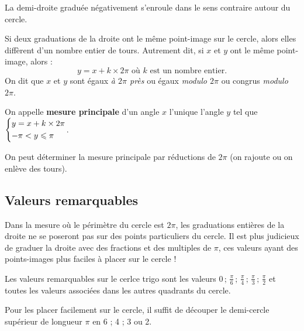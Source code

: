 \documentclass[a4paper,11pt]{article}
\begin{document}
\begin{crmq}
La demi-droite graduée négativement s'enroule dans le sens contraire autour du cercle.
\end{crmq}

\begin{cprop}
Si deux graduations de la droite ont le même point-image sur le cercle, alors elles diffèrent d'un nombre entier de tours. Autrement dit, si $x$ et $y$ ont le même point-image, alors : \[y=x+k\times 2\pi \text{ où } k \text{ est un nombre entier.}\]%
On dit que $x$ et $y$ sont égaux \emph{à $2\pi$ près} ou égaux \emph{modulo $2\pi$} ou congrus \emph{modulo $2\pi$}.
\end{cprop}

\begin{ccscq}
On appelle \textbf{mesure principale} d'un angle $x$ l'unique l'angle $y$ tel que $\begin{dcases} y=x+k\times 2\pi \\ -\pi < y \leqslant \pi \end{dcases}$.

On peut déterminer la mesure principale par \og réductions \fg{} de $2\pi$ (on \og rajoute \fg{} ou on \og enlève \fg{} des tours).
\end{ccscq}

\subsection{Valeurs remarquables}

\begin{crmq}
Dans la mesure où le périmètre du cercle est $2\pi$, les graduations entières de la droite ne se poseront pas sur des points particuliers du cercle. Il est plus judicieux de graduer la droite avec des fractions et des multiples de $\pi$, ces valeurs ayant des points-images plus faciles à placer sur le cercle !
\end{crmq}

\begin{cprop}
Les valeurs remarquables sur le cerlce trigo sont les valeurs $0\,;\,\frac{\pi}{6}\,;\,\frac{\pi}{4}\,;\,\frac{\pi}{3}\,;\,\frac{\pi}{2}$ et toutes les valeurs associées dans les autres quadrants du cercle.

\smallskip

Pour les placer facilement sur le cercle, il suffit de \og découper \fg{} le demi-cercle supérieur de longueur $\pi$ en 6 ; 4 ; 3 ou 2.
\end{cprop}
\end{document}
